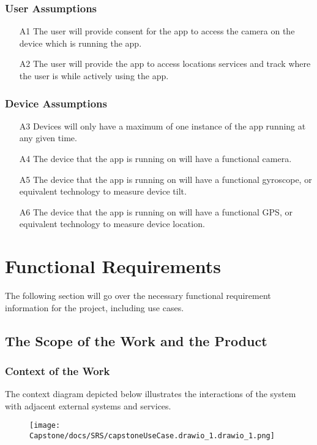 \documentclass[12pt]{article}
\begin{document}
\subsubsection{User Assumptions}
\begin{itemize}
    \item [A1] The user will provide consent for the app to access the camera on the device which is running the app. 
    \item [A2] The user will provide the app to access locations services and track where the user is while actively using the app. 
\end{itemize}

\subsubsection{Device Assumptions}
\begin{itemize}
    \item [A3] Devices will only have a maximum of one instance of the app running at any given time. 
    \item [A4] The device that the app is running on will have a functional camera. 
    \item [A5] The device that the app is running on will have a functional gyroscope, or equivalent technology to measure device tilt. 
    \item [A6] The device that the app is running on will have a functional GPS, or equivalent technology to measure device location. 
\end{itemize}

\section{Functional Requirements}
The following section will go over the necessary functional requirement information for the project, including use cases. 
\subsection{The Scope of the Work and the Product}
\subsubsection{Context of the Work}
The context diagram depicted below illustrates the interactions of the system with adjacent
external systems and services.
\begin{figure}[htbp]
\centerline{\texttt{[image: Capstone/docs/SRS/capstoneUseCase.drawio\_1.drawio\_1.png]}}
\label{UseCaseDiagram}
\end{figure}
\end{document}
